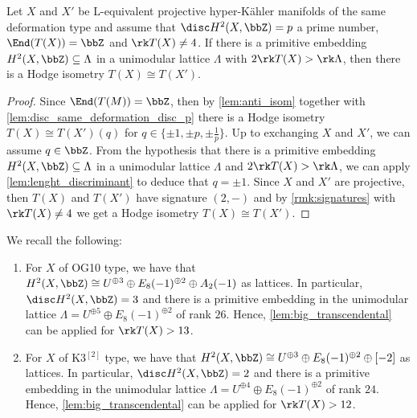 \documentclass{amsart}
\begin{document}
\begin{lemma}\label{lem:big_transcendental}
    Let \(X\) and \(X'\) be L-equivalent projective hyper-Kähler manifolds of the same deformation type and assume that \(\disc H^2(X,\bbZ)=p\) a prime number, \(\End(T(X))=\bbZ\) and \(\rk T(X)\not= 4\). If there is a primitive embedding \(H^2(X,\bbZ)\subseteq \Lambda\) in a unimodular lattice \(\Lambda\) with \(2 \rk T(X)>\rk \Lambda\), then there is a Hodge isometry \(T(X)\cong T(X')\).
\end{lemma}
\begin{proof}
     Since \(\End(T(M))=\bbZ\), then by \autoref{lem:anti_isom} together with \autoref{lem:disc_same_deformation_disc_p} there is a Hodge isometry \(T(X)\cong T(X')(q)\) for \(q\in\{\pm 1, \pm p, \pm \frac{1}{p}\}\). Up to exchanging \(X\) and \(X'\), we can assume \(q\in \bbZ\). From the hypothesis that there is a primitive embedding \(H^2(X,\bbZ)\subseteq \Lambda\) in a unimodular lattice \(\Lambda\) and \(2 \rk T(X)>\rk \Lambda\), we can apply \autoref{lem:lenght_discriminant} to deduce that \(q=\pm 1\). Since \(X\) and \(X'\) are projective, then \(T(X)\) and \(T(X')\) have signature \((2,-)\) and by \autoref{rmk:signatures} with \(\rk T(X)\not=4 \) we get a Hodge isometry \(T(X)\cong T(X')\). 
\end{proof}


\begin{remark}\label{rmk:lattices_for_defos}
We recall the following:
\begin{enumerate}
    \item  For \(X\) of OG10 type, we have that \(H^2(X,\bbZ)\cong U^{\oplus 3}\oplus E_8(-1)^{\oplus 2}\oplus A_2(-1)\) as lattices. In particular, \(\disc H^2(X,\bbZ)=3\) and there is a primitive embedding in the unimodular lattice \(\Lambda=U^{\oplus 5}\oplus E_8(-1)^{\oplus 2}\) of rank \(26\). Hence, \autoref{lem:big_transcendental} can be applied for \(\rk T(X)>13\).
    \item  For \(X\) of K3\(^{[2]}\) type, we have that \(H^2(X,\bbZ)\cong U^{\oplus 3}\oplus E_8(-1)^{\oplus 2}\oplus [-2]\) as lattices. In particular, \(\disc H^2(X,\bbZ)=2\) and there is a primitive embedding in the unimodular lattice \(\Lambda=U^{\oplus 4}\oplus E_8(-1)^{\oplus 2}\) of rank \(24\). Hence, \autoref{lem:big_transcendental} can be applied for \(\rk T(X)>12\).
\end{enumerate}
   
\end{remark}
\end{document}
